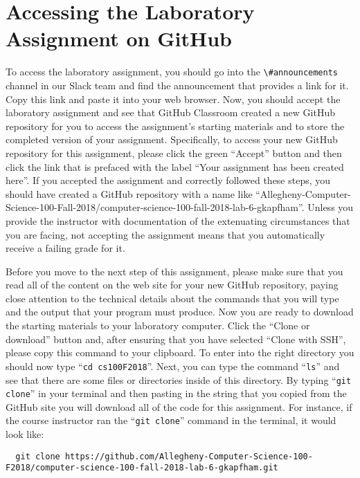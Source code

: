 \documentclass[11pt]{article}
\newcommand{\command}[1]{``\lstinline{#1}''}
\newcommand{\channel}[1]{\lstinline{#1}}
\begin{document}
\section*{Accessing the Laboratory Assignment on GitHub}

To access the laboratory assignment, you should go into the
\channel{\#announcements} channel in our Slack team and find the announcement
that provides a link for it. Copy this link and paste it into your web browser.
Now, you should accept the laboratory assignment and see that GitHub Classroom
created a new GitHub repository for you to access the assignment's starting
materials and to store the completed version of your assignment. Specifically,
to access your new GitHub repository for this assignment, please click the green
``Accept'' button and then click the link that is prefaced with the label ``Your
assignment has been created here''. If you accepted the assignment and correctly
followed these steps, you should have created a GitHub repository with a name
like
``Allegheny-Computer-Science-100-Fall-2018/computer-science-100-fall-2018-lab-6-gkapfham''.
Unless you provide the instructor with documentation of the extenuating
circumstances that you are facing, not accepting the assignment means that you
automatically receive a failing grade for it.

Before you move to the next step of this assignment, please make sure that you
read all of the content on the web site for your new GitHub repository, paying
close attention to the technical details about the commands that you will type
and the output that your program must produce. Now you are ready to download the
starting materials to your laboratory computer. Click the ``Clone or download''
button and, after ensuring that you have selected ``Clone with SSH'', please
copy this command to your clipboard. To enter into the right directory you
should now type \command{cd cs100F2018}. Next, you can type the command
\command{ls} and see that there are some files or directories inside of this
directory. By typing \command{git clone} in your terminal and then pasting in
the string that you copied from the GitHub site you will download all of the
code for this assignment. For instance, if the course instructor ran the
\command{git clone} command in the terminal, it would look like:

\begin{lstlisting}
  git clone https://github.com/Allegheny-Computer-Science-100-F2018/computer-science-100-fall-2018-lab-6-gkapfham.git
\end{lstlisting}
\end{document}
